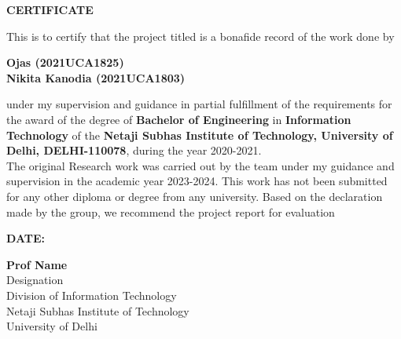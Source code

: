 \thispagestyle{plain}
\begin{center}
\large \large \textbf{CERTIFICATE}
\end{center}

\vspace{0.3cm}
\fontsize{12pt}{24pt}\selectfont This is to certify that the project titled \textbf{\btptitle} is a bonafide record of the work done by
\vspace{1.0cm}

\begin{center}
\textbf{Ojas (2021UCA1825)\\Nikita Kanodia (2021UCA1803)}
\end{center}

\vspace{1.0cm}
\noindent
\fontsize{12pt}{24pt}\selectfont under my supervision and guidance in partial fulfillment of the requirements for the award of the degree of \textbf{Bachelor of Engineering} in \textbf{Information Technology} of the \textbf{Netaji Subhas Institute of Technology, University of Delhi, DELHI-110078}, during the year 2020-2021. \\ \indent  The original Research work was carried out by the team under my guidance and supervision in the academic year 2023-2024. This work has not been submitted for any other
 diploma or degree from any university. Based on the declaration made by the group, we
 recommend the project report for evaluation

\vspace{2.5cm}
\textbf{DATE: }
\begin{flushright}
\vspace{2.5cm}
 \textbf{Prof Name} \\
 Designation\\
 Division of Information Technology\\
 Netaji Subhas Institute of Technology\\
 University of Delhi

\end{flushright}






\newpage
